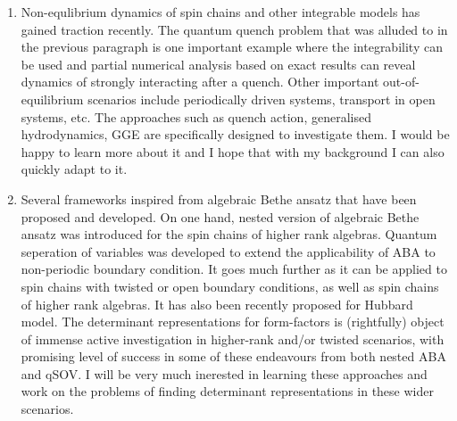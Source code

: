 \documentclass[a4paper, 12pt, DIV=13]{scrarticle}
\begin{document}
\begin{enumerate}
\item Non-equlibrium dynamics of spin chains and other integrable models has gained traction recently. The quantum quench problem that was alluded to in the previous paragraph is one important example where the integrability can be used and partial numerical analysis based on exact results can reveal dynamics of strongly interacting after a quench.
Other important out-of-equilibrium scenarios include periodically driven systems, transport in open systems, etc. The approaches such as quench action, generalised hydrodynamics, GGE are specifically designed to investigate them. I would be happy to learn more about it and I hope that with my background I can also quickly adapt to it.
\item Several frameworks inspired from algebraic Bethe ansatz that have been proposed and developed.
On one hand, nested version of algebraic Bethe ansatz was introduced for the spin chains of higher rank algebras.
Quantum seperation of variables was developed to extend the applicability of ABA to non-periodic boundary condition. It goes much further as it can be applied to spin chains with twisted or open boundary conditions, as well as spin chains of higher rank algebras.
It has also been recently proposed for Hubbard model.
The determinant representations for form-factors is (rightfully) object of immense active investigation in higher-rank and/or twisted scenarios, with promising level of success in some of these endeavours from both nested ABA and qSOV.
I will be very much inerested in learning these approaches and work on the problems of finding determinant representations in these wider scenarios.
\end{enumerate}
\end{document}
